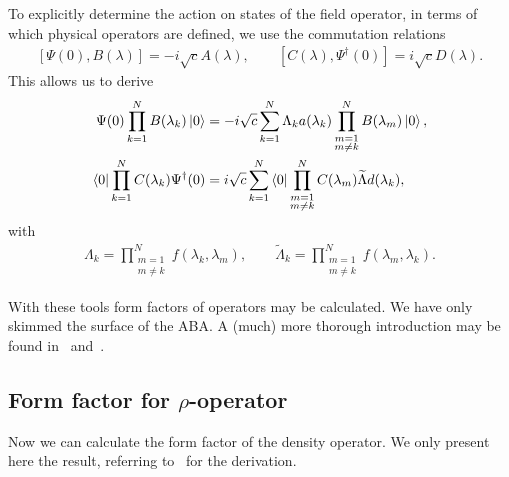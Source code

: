 \documentclass[11pt, a4paper]{report} %
\begin{document}
To explicitly determine the action on states of the field operator, in terms of which physical operators are defined, we use the commutation relations
\begin{align}
  \label{eq:47}
  [\Psi(0),B(\lambda)] = -i \sqrt{c} A(\lambda), \qquad [C(\lambda), \Psi^{\dag}(0)] = i \sqrt{c} D(\lambda).
\end{align}
This allows us to derive
\begin{align}
  \label{eq:48}
  \Psi(0) \prod_{k=1}^N B(\lambda_k) \ket{0} &= -i\sqrt{c} \sum_{k=1}^N\Lambda_k a(\lambda_k) \prod_{\substack{m=1\\m\neq k}}^N B(\lambda_m) \ket{0},\\
  \bra{0} \prod_{k=1}^N C(\lambda_k) \Psi^{\dag}(0) &= i \sqrt{c} \sum_{k=1}^N \bra{0} \prod_{\substack{m=1\\m\neq k}}^N C(\lambda_m) \widetilde{\Lambda} d(\lambda_k),
\end{align}
with~\cite{Piroli2015}
\begin{align}
  \label{eq:49}
  \Lambda_k = \prod_{\substack{m=1\\m\neq k}}^N f(\lambda_k,\lambda_m), \qquad \widetilde{\Lambda}_k = \prod_{\substack{m=1\\m\neq k}}^N f(\lambda_m,\lambda_k).
\end{align}

With these tools form factors of operators may be calculated.
We have only skimmed the surface of the ABA.
A (much) more thorough introduction may be found in~\cite{Korepin1993} and~\cite{slavnov18_algeb_bethe_ansat}.


\subsection{Form factor for \(\rho\)-operator}

Now we can calculate the form factor of the density operator.
We only present here the result, referring to~\cite{slavnov90_noneq_time_curren_correl_funct} for the derivation.
\end{document}
